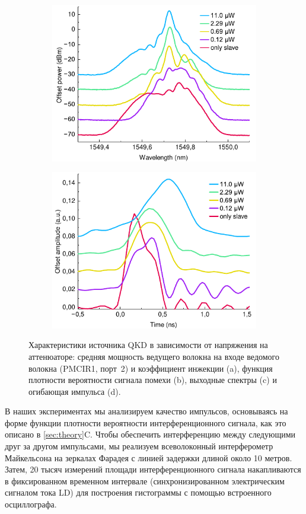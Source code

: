 \begin{figure}
\begin{subfigure}{0.49\linewidth}
	\includegraphics[width=\textwidth]{images/spectra_att.pdf}
	\caption{}
\end{subfigure}
\hfill
\begin{subfigure}{0.49\linewidth}
	\centering
	\includegraphics[width=\textwidth]{images/envelope_att.pdf}
	\caption{}
\end{subfigure}
\caption{Характеристики источника QKD в зависимости от напряжения на аттенюаторе: средняя мощность ведущего волокна на входе ведомого волокна (PMCIR1, порт~2) и коэффициент инжекции (a), функция плотности вероятности сигнала помехи (b), выходные спектры (c) и огибающая импульса (d).}
\label{fig:QKD_att}
\end{figure}
В наших экспериментах мы анализируем качество импульсов, основываясь на форме функции плотности вероятности интерференционного сигнала, как это описано в \cref{sec:theory}C. Чтобы обеспечить интерференцию между следующими друг за другом импульсами, мы реализуем всеволоконный интерферометр Майкельсона на зеркалах Фарадея с линией задержки длиной около 10 метров. Затем, 20 тысяч  измерений площади интерференционного сигнала накапливаются в фиксированном временном интервале (синхронизированном электрическим сигналом тока LD) для построения гистограммы с помощью встроенного осциллографа.

